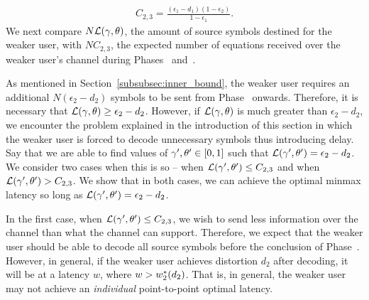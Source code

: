 \begin{align}
	C_{2,3} = \frac{(\epsilon_1 - d_1)(1 - \epsilon_2)}{1 - \epsilon_1}.
\end{align}
We next compare $N\mathcal{L}(\gamma, \theta)$, the amount of source symbols destined for the weaker user, with $NC_{2, 3}$,  the expected number of equations received over the weaker user's channel during Phases~ and~.  

As mentioned in Section~\ref{subsubsec:inner_bound}, the weaker user requires an additional $N(\epsilon_2 - d_2)$ symbols to be sent from Phase~ onwards.  Therefore, it is necessary that $\mathcal{L}(\gamma, \theta) \geq \epsilon_2 - d_2$.  However, if $\mathcal{L}(\gamma, \theta)$ is much greater than $\epsilon_2 - d_2$, we encounter the problem explained in the introduction of this section in which the weaker user is forced to decode unnecessary symbols thus introducing delay.  Say that we are able to find values of $\gamma', \theta' \in [0, 1]$ such that $\mathcal{L}(\gamma', \theta') = \epsilon_2 - d_2$.  We consider two cases when this is so -- when $\mathcal{L}(\gamma', \theta') \leq C_{2, 3}$ and when $\mathcal{L}(\gamma', \theta') > C_{2, 3}$.  We show that in both cases, we can achieve the optimal minmax  latency so long as $\mathcal{L}(\gamma', \theta') = \epsilon_2 - d_2$.

In the first case, when $\mathcal{L}(\gamma', \theta') \leq C_{2, 3}$, we wish to send less information over the channel than what the channel can support.  Therefore, we expect that the weaker user should be able to decode all source symbols before the conclusion of Phase~.  However, in general, if the weaker user achieves distortion $d_2$ after decoding, it will be at a latency $w$, where $w > w_{2}^{*}(d_2)$.  That is, in general, the weaker user may not achieve an \emph{individual} point-to-point optimal latency.

